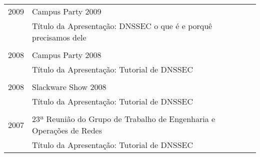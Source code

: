 \documentclass[a4paper, oneside, final]{scrartcl}
\begin{document}
\begin{center}
\begin{tabularx}{0.97\linewidth}{p{2cm}X}
2009        & Campus Party 2009\\
            & Título da Apresentação: DNSSEC o que é e porquê precisamos dele\\ \\

2008        & Campus Party 2008\\
            & Título da Apresentação: Tutorial de DNSSEC\\ \\

2008        & Slackware Show 2008\\
            & Título da Apresentação: Tutorial de DNSSEC\\ \\

2007        & 23ª Reunião do Grupo de Trabalho de Engenharia e Operações de Redes\\
            & Título da Apresentação: Tutorial de DNSSEC
\end{tabularx}


\end{center}
\end{document}
